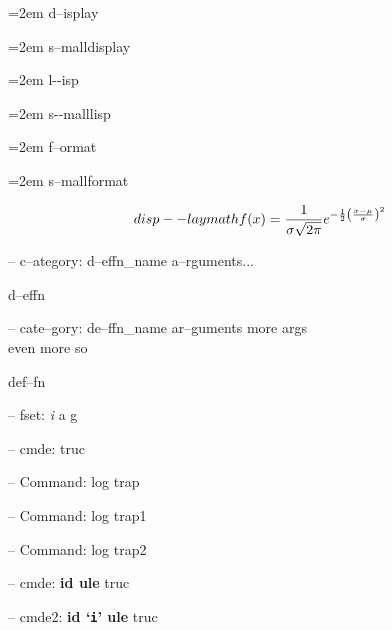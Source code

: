 \documentclass{book}
\begin{document}
\begin{titlepage}
\par\begingroup\obeylines\obeyspaces\frenchspacing\leftskip=2em\relax\parskip=0pt\relax{}%
d--isplay
\endgroup{}%

\par\begingroup\obeylines\obeyspaces\frenchspacing\leftskip=2em\relax\parskip=0pt\relax\footnotesize{}%
s--malldisplay
\endgroup{}%

\par\begingroup\obeylines\obeyspaces\frenchspacing\leftskip=2em\relax\parskip=0pt\relax\ttfamily{}%
l{-}{-}isp
\endgroup{}%

\par\begingroup\obeylines\obeyspaces\frenchspacing\leftskip=2em\relax\parskip=0pt\relax\ttfamily\footnotesize{}%
s{-}{-}malllisp
\endgroup{}%

\par\begingroup\obeylines\obeyspaces\frenchspacing\leftskip=2em\relax\parskip=0pt\relax{}%
f--ormat
\endgroup{}%

\par\begingroup\obeylines\obeyspaces\frenchspacing\leftskip=2em\relax\parskip=0pt\relax\footnotesize{}%
s--mallformat
\endgroup{}%

$$
disp--laymath
f(x) = {1 \over \sigma \sqrt{2\pi}}e^{-{1 \over 2}\left({x-\mu \over \sigma}\right)^2}
$$

\hbox{}-- c--ategory: d--effn\_name a--rguments...


%
d--effn

\hbox{}-- cate--gory: de--ffn\_name ar--guments    more args \leavevmode{}\\ even more so


%
def--fn

\hbox{}-- fset: \emph{i} a g


%
%
\hbox{}-- cmde: truc 


%
\hbox{}-- Command: log trap 


%
\hbox{}-- Command: log trap1 


%
\hbox{}-- Command: log trap2 


%
\hbox{}-- cmde: \textbf{id ule} truc


%
\hbox{}-- cmde2: \textbf{id `\texttt{i}' ule} truc



\end{titlepage}
\end{document}
